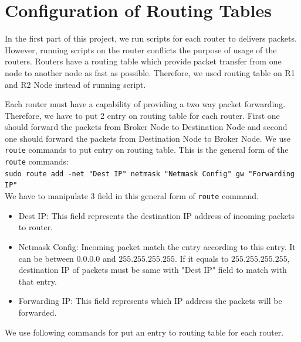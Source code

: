 \documentclass[conference]{IEEEtran}
\begin{document}
\section{Configuration of Routing Tables}
In the first part of this project, we run scripts for each router to delivers packets. However, running scripts on the router conflicts the purpose of usage of the routers. Routers have a routing table which provide packet transfer from one node to another node as fast as possible. Therefore, we used routing table on R1 and R2 Node instead of running script.
\par Each router must have a capability of providing a two way packet forwarding. Therefore, we have to put 2 entry on routing table for each router. First one should forward the packets from Broker Node to Destination Node and second one should forward the packets from Destination Node to Broker Node. We use \texttt{route} commands to put entry on routing table. This is the general form of the \texttt{route} commands: \\
\texttt{sudo route add -net "Dest IP" netmask "Netmask Config" gw "Forwarding IP"} \\
We have to manipulate 3 field in this general form of \texttt{route} command. 
\begin{itemize}
    \item Dest IP: This field represents the destination IP address of incoming packets to router.
    \item Netmask Config: Incoming packet match the entry according to this entry. It can be between $0.0.0.0$ and $255.255.255.255$. If it equals to $255.255.255.255$, destination IP of packets must be same with "Dest IP" field to match with that entry.
    \item Forwarding IP: This field represents which IP address the packets will be forwarded.
\end{itemize}
We use following commands for put an entry to routing table for each router. 
\end{document}
